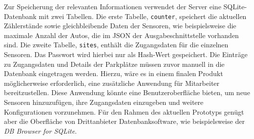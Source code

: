 Zur Speicherung der relevanten Informationen verwendet der Server eine SQLite-Datenbank mit zwei Tabellen.
Die erste Tabelle, \lstinline|counter|, speichert die aktuellen Zählerstände sowie gleichbleibende Daten der Sensoren, wie beispielsweise die maximale Anzahl der Autos, die im JSON der Ausgabeschnittstelle vorhanden sind.
Die zweite Tabelle, \lstinline|sites|, enthält die Zugangsdaten für die einzelnen Sensoren.
Das Passwort wird hierbei nur als Hash-Wert gespeichert.
Die Einträge zu Zugangsdaten und Details der Parkplätze müssen zuvor manuell in die Datenbank eingetragen werden.
Hierzu, wäre es in einem finalen Produkt möglicherweise erforderlich, eine zusätzliche Anwendung für Mitarbeiter bereitzustellen.
Diese Anwendung könnte eine Benutzeroberfläche bieten, um neue Sensoren hinzuzufügen, ihre Zugangsdaten einzugeben und weitere Konfigurationen vorzunehmen.
Für den Rahmen des aktuellen Prototyps genügt aber die Oberfläche von Drittanbieter Datenbanksoftware, wie beispielsweise der \textit{DB Browser for SQLite}.
